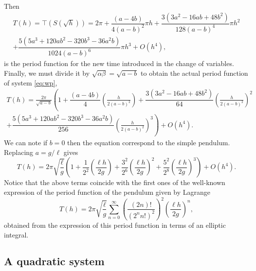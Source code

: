 \documentclass[12pt,a4paper,reqno]{amsart}
\begin{document}
Then
\begin{multline*}
T(h) = \top(S(\sqrt{h}))= 2 \pi + \dfrac{(a-4b)}{4(a-b)^2} \pi h +
\dfrac{3(3a^2 - 16 ab + 48b^2)}{128(a-b)^4} \pi h^2\\
+\dfrac{5(5a^3+120a b^2 -320 b^3-36a^2b)}{1024(a-b)^6} \pi h^3  + O(
h^4),
\end{multline*}
is the period function for the new time introduced in the change of
variables. Finally, we must divide it by $ \sqrt {\alpha \beta }
=\sqrt{a-b}$ to obtain the actual period function of system
\eqref{eq:wp},
\begin{multline*}
T(h) =  \frac{2\pi}{\sqrt{a-b}}\left(1+ \dfrac{(a-4b)}{4}
\left(\frac{h}{2(a-b)^2}\right) +
\dfrac{3(3a^2 - 16 ab + 48b^2)}{64} \left(\frac{h}{2(a-b)^2}\right)^2  \right.\\
 \left.+\dfrac{5(5a^3+120a b^2 -320 b^3-36a^2b)}{256} \left(\frac{h}{2(a-b)^2}\right)^3\right)  +   O ( h^4).
\end{multline*}
We can note if $b=0$ then the equation correspond to the simple
pendulum. Replacing $a=g/\ell$  gives
\begin{equation*}
T(h) =  2\pi\sqrt{\frac{\ell}{g}}\left(1+ \dfrac{1}{2^2}
\left(\frac{\ell h}{2g}\right) + \dfrac{3^2}{2^6} \left(\frac{\ell
h}{2g}\right)^2+\dfrac{5^2}{2^{8}} \left(\frac{\ell h}{2g}\right)^3
\right)+ O( h^4).
\end{equation*}
Notice that the above terms  coincide with the first ones of the
well-known expression of the period function of the pendulum given
by Lagrange
\[
T(h)=2\pi\sqrt{\frac{\ell}{g}} \sum_{n=0}^\infty
\left(\frac{(2n)!}{(2^n n!)^2}\right)^2 \left(\frac{\ell
h}{2g}\right)^{n},
\]
obtained from the expression of this period function in terms of an
elliptic integral.

\subsection{A quadratic system}%
\end{document}
